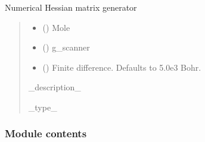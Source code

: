 \documentclass[letterpaper,10pt,english]{sphinxmanual}
\begin{document}
\begin{fulllineitems}
\begin{fulllineitems}
\end{fulllineitems}


\end{fulllineitems}


\begin{fulllineitems}
\label{\detokenize{fcdft.hessian:fcdft.hessian.numhess.hess_generator}}
\pysigstartsignatures
\pysiglinewithargsret
{}
{\sphinxparamcomma {}\sphinxparamcomma {}\sphinxparamcomma {}}
{}
\pysigstopsignatures
\sphinxAtStartPar
Numerical Hessian matrix generator
\begin{quote}\begin{description}
\begin{itemize}
\item {} 
\sphinxAtStartPar
{} () \textendash{} Mole

\item {} 
\sphinxAtStartPar
{} () \textendash{} g\_scanner

\item {} 
\sphinxAtStartPar
{} (\sphinxstyleliteralemphasis{\sphinxupquote{, }}) \textendash{} Finite difference. Defaults to 5.0e\sphinxhyphen{}3 Bohr.

\end{itemize}

\sphinxAtStartPar
\_description\_

\sphinxAtStartPar
\_type\_

\end{description}\end{quote}

\end{fulllineitems}



\subsubsection{Module contents}
\label{\detokenize{fcdft.hessian:module-fcdft.hessian}}\label{\detokenize{fcdft.hessian:module-contents}}
\sphinxstepscope
\end{document}
